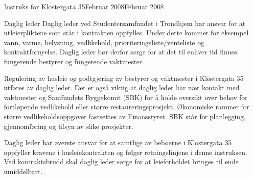\begin{instruks}{Instruks for Klostergata 35}{Februar 2008}{Februar 2008}
    \begin{instruksledd}{Daglig leder}
        Daglig leder ved Studentersamfundet i Trondhjem har ansvar for at utleierpliktene
        som står i kontrakten oppfylles.
        Under dette kommer for eksempel vann, varme, belysning, vedlikehold,
        prioriteringsliste/venteliste og
        kontraktfornyelse. Daglig leder bør derfor sørge for at det til enhver tid finnes
        fungerende bestyrer og fungerende
        vaktmester.

        Regulering av husleie og godtgjøring av bestyrer og vaktmester i Klostergata 35
        utføres av daglig leder.
        Det er også viktig at daglig leder har nær kontakt med vaktmester og Samfundets
        Byggekomit (SBK) for å holde
        oversikt over behov for fortløpende vedlikehold eller større
        restaureringsprosjekt. Økonomiske rammer for større
        vedlikeholdsoppgaver fastsettes av Finansstyret. SBK står for planlegging,
        gjennomføring og tilsyn av slike
        prosjekter.

        Daglig leder har øverste ansvar for at samtlige av beboerne i Klostergata 35
        oppfyller kravene i husleiekontrakten og
        følger retningslinjene i denne instruksen. Ved kontraktsbrudd skal daglig leder
        sørge for at leieforholdet bringes til
        ende umiddelbart.

    \end{instruksledd}
\end{instruks}



















